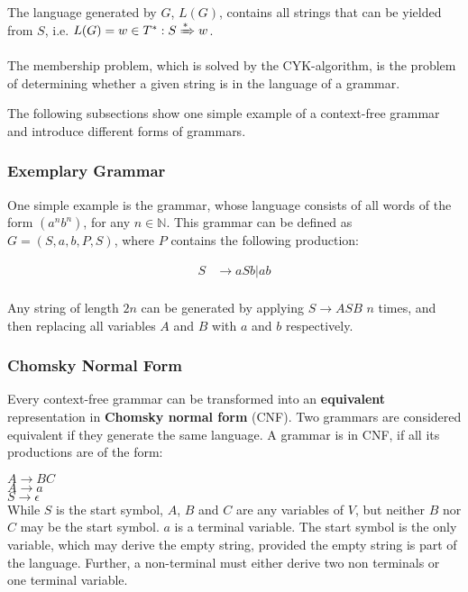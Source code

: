 The language generated by $G$, $L(G)$, contains all strings that can be yielded from $S$, i.e. $L(G)={w\in T^*: S\xRightarrow{*}w}$.

The membership problem, which is solved by the CYK-algorithm, is the problem of determining whether a given string is in the language of a grammar.

The following subsections show one simple example of a context-free grammar and introduce different forms of grammars.

\subsubsection{Exemplary Grammar}
\label{subsec:exemplary_grammar}


One simple example is the grammar, whose language consists of all words of the form $(a^n b^n)$, for any $n\in \mathbb{N}$.
This grammar can be defined as $G = ({S}, {a, b}, P, S)$, where $P$ contains the following production: 

\begin{align*}
S&\rightarrow aSb | ab \\
\end{align*}

Any string of length $2n$ can be generated by applying $S\rightarrow ASB$ $n$ times, and then replacing all variables $A$ and $B$ with $a$ and $b$ respectively.


\subsubsection{Chomsky Normal Form}

Every context-free grammar can be transformed into an \textbf{equivalent} representation in \textbf{Chomsky normal form} (CNF).
Two grammars are considered equivalent if they generate the same language.
A grammar is in CNF, if all its productions are of the form:

\hspace*{0.5cm}$A\rightarrow BC$\\
\hspace*{1cm}$A\rightarrow a$\\
\hspace*{1cm}$S\rightarrow \epsilon$\\

While $S$ is the start symbol, $A$, $B$ and $C$ are any variables of $V$, but neither $B$ nor $C$ may be the start symbol.
$a$ is a terminal variable.
The start symbol is the only variable, which may derive the empty string, provided the empty string is part of the language.
Further, a non-terminal must either derive two non terminals or one terminal variable.

